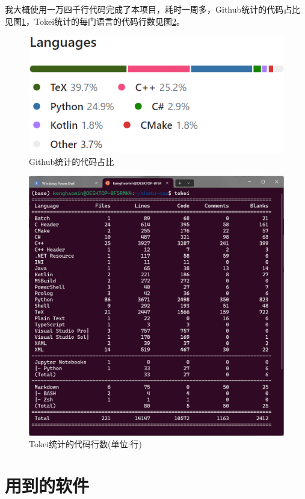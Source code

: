 我大概使用一万四千行代码完成了本项目，耗时一周多，Github统计的代码占比见图\ref{fig:statgithub}，Tokei统计的每门语言的代码行数见图\ref{fig:stattokei}。

\begin{figure}
	\centering
	\includegraphics[width=0.9\linewidth]{Resources/Picture/stat_github}
	\caption{Github统计的代码占比}
	\label{fig:statgithub}
\end{figure}

\begin{figure}
	\centering
	\includegraphics[width=0.9\linewidth]{Resources/Picture/stat_tokei}
	\caption{Tokei统计的代码行数(单位:行)}
	\label{fig:stattokei}
\end{figure}

\section{用到的软件}

